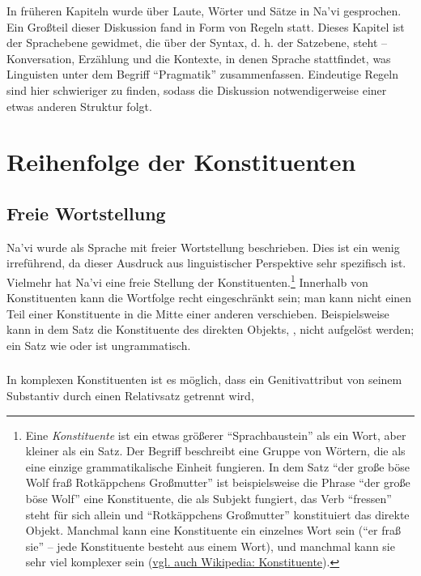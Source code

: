 
\noindent In früheren Kapiteln wurde über Laute, Wörter und Sätze in Na'vi gesprochen. Ein Großteil dieser Diskussion fand in Form von Regeln statt. Dieses Kapitel ist der Sprachebene gewidmet, die über der Syntax, d. h. der Satzebene, steht -- Konversation, Erzählung und die Kontexte, in denen Sprache stattfindet, was Linguisten unter dem Begriff ``Pragmatik'' zusammenfassen. Eindeutige Regeln sind hier schwieriger zu finden, sodass die Diskussion notwendigerweise einer etwas anderen Struktur folgt.


\section{Reihenfolge der Konstituenten}

\subsection{Freie Wortstellung} Na'vi wurde als Sprache mit freier Wortstellung beschrieben. Dies ist ein wenig irreführend, da dieser Ausdruck aus linguistischer Perspektive sehr spezifisch ist. Vielmehr hat Na'vi eine freie Stellung der Konstituenten.\footnote{Eine \textit{Konstituente} ist ein etwas größerer ``Sprachbaustein'' als ein Wort, aber kleiner als ein Satz. Der Begriff beschreibt eine Gruppe von Wörtern, die als eine einzige grammatikalische Einheit fungieren. In dem Satz ``der große böse Wolf fraß Rotkäppchens Großmutter'' ist beispielsweise die Phrase ``der große böse Wolf'' eine Konstituente, die als Subjekt fungiert, das Verb ``fressen'' steht für sich allein und ``Rotkäppchens Großmutter'' konstituiert das direkte Objekt. Manchmal kann eine Konstituente ein einzelnes Wort sein (``er fraß sie'' -- jede Konstituente besteht aus einem Wort), und manchmal kann sie sehr viel komplexer sein (\href{https://de.wikipedia.org/wiki/Konstituente}{vgl. auch Wikipedia: Konstituente}).} Innerhalb von Konstituenten kann die Wortfolge recht eingeschränkt sein; man kann nicht einen Teil einer Konstituente in die Mitte einer anderen verschieben. Beispielsweise kann in dem Satz   die Konstituente des direkten Objekts, , nicht aufgelöst werden; ein Satz wie  oder  ist ungrammatisch.

\subsubsection{} In komplexen Konstituenten ist es möglich, dass ein Genitivattribut von seinem Substantiv durch einen Relativsatz getrennt wird, 

